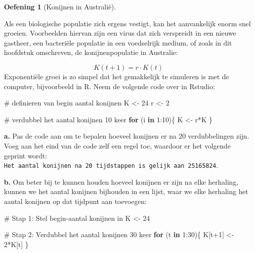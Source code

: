 \documentclass[
  a4paper,
]{scrbook}
\newenvironment{Shaded}{\begin{snugshade}}{\end{snugshade}}
\newcommand{\CommentTok}[1]{\textcolor[rgb]{0.37,0.37,0.37}{#1}}
\newcommand{\ControlFlowTok}[1]{\textcolor[rgb]{0.00,0.23,0.31}{\textbf{#1}}}
\newcommand{\DecValTok}[1]{\textcolor[rgb]{0.68,0.00,0.00}{#1}}
\newcommand{\NormalTok}[1]{\textcolor[rgb]{0.00,0.23,0.31}{#1}}
\newcommand{\OtherTok}[1]{\textcolor[rgb]{0.00,0.23,0.31}{#1}}
\newcommand{\SpecialCharTok}[1]{\textcolor[rgb]{0.37,0.37,0.37}{#1}}
\theoremstyle{definition}
\newtheorem{exercise}{Oefening}[chapter]
\theoremstyle{remark}
\begin{document}
\begin{exercise}[Konijnen in
Australië]\protect\hypertarget{exr-rabbits-map}{}\label{exr-rabbits-map}

Als een biologische populatie zich ergens vestigt, kan het aanvankelijk
enorm snel groeien. Voorbeelden hiervan zijn een virus dat zich
verspreidt in een nieuwe gastheer, een bacteriële populatie in een
voedselrijk medium, of zoals in dit hoofdstuk omschreven, de
konijnenpopulatie in Australie:

\[
K(t+1) = r \cdot K(t) 
\] Exponentiële groei is zo simpel dat het gemakkelijk te simuleren is
met de computer, bijvoorbeeld in R. Neem de volgende code over in
Rstudio:

\begin{Shaded}
\begin{Highlighting}[]
\CommentTok{\# definieren van begin aantal konijnen}
\NormalTok{K }\OtherTok{\textless{}{-}} \DecValTok{24}
\NormalTok{r }\OtherTok{\textless{}{-}} \DecValTok{2}

\CommentTok{\# verdubbel het aantal konijnen 10 keer}
\ControlFlowTok{for}\NormalTok{ (i }\ControlFlowTok{in} \DecValTok{1}\SpecialCharTok{:}\DecValTok{10}\NormalTok{)\{}
\NormalTok{    K }\OtherTok{\textless{}{-}}\NormalTok{ r}\SpecialCharTok{*}\NormalTok{K}
\NormalTok{\}}
\end{Highlighting}
\end{Shaded}

\textbf{a.} Pas de code aan om te bepalen hoeveel konijnen er na 20
verdubbelingen zijn. Voeg aan het eind van de code zelf een regel toe,
waardoor er het volgende geprint wordt:
\texttt{Het\ aantal\ konijnen\ na\ 20\ tijdstappen\ is\ gelijk\ aan\ 25165824}.

\textbf{b.} Om beter bij te kunnen houden hoeveel konijnen er zijn na
elke herhaling, kunnen we het aantal konijnen bijhouden in een lijst,
waar we elke herhaling het aantal konijnen op dat tijdpunt aan
toevoegen:

\begin{Shaded}
\begin{Highlighting}[]
\CommentTok{\# Stap 1: Stel begin{-}aantal konijnen in}
\NormalTok{K }\OtherTok{\textless{}{-}} \DecValTok{24}

\CommentTok{\# Stap 2: Verdubbel het aantal konijnen 30 keer}
\ControlFlowTok{for}\NormalTok{ (t }\ControlFlowTok{in} \DecValTok{1}\SpecialCharTok{:}\DecValTok{30}\NormalTok{)\{}
\NormalTok{  K[t}\SpecialCharTok{+}\DecValTok{1}\NormalTok{] }\OtherTok{\textless{}{-}} \DecValTok{2}\SpecialCharTok{*}\NormalTok{K[t]}
\NormalTok{\}}


\end{Highlighting}
\end{Shaded}
\end{exercise}
\end{document}
